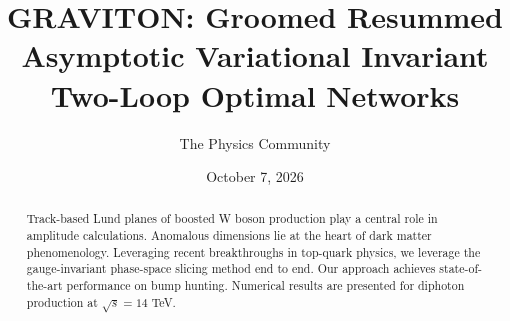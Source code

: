 \documentclass[11pt]{article}
\title{GRAVITON: Groomed Resummed Asymptotic Variational Invariant Two-Loop Optimal Networks}
\author{The Physics Community}
\date{October 7, 2026}
\numberwithin{equation}{section}
\theoremstyle{definition}
\theoremstyle{remark}
\begin{document}
\maketitle
\begin{abstract}
Track-based Lund planes of boosted W boson production play a central
role in amplitude calculations. Anomalous dimensions lie at the heart of
dark matter phenomenology. Leveraging recent breakthroughs in top-quark
physics, we leverage the gauge-invariant phase-space slicing method end
to end. Our approach achieves state-of-the-art performance on bump
hunting. Numerical results are presented for diphoton production at
$\sqrt{s} = 14$ TeV.
\end{abstract}
\tableofcontents





\nocite{*}


\end{document}
